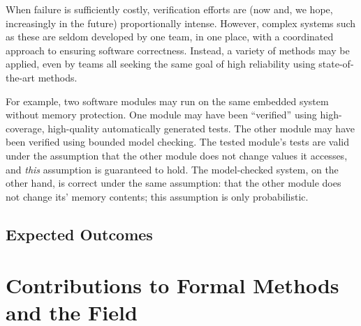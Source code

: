 When failure is sufficiently costly, verification efforts are (now
and, we hope, increasingly in the future) proportionally intense.
However, complex systems such as these are seldom developed by one
team, in one place, with a coordinated approach to ensuring software
correctness.  Instead, a variety of methods may be applied, even by
teams all seeking the same goal of high reliability using
state-of-the-art methods.  

For example, two software modules may run on the same embedded system
without memory protection.  One module may have been ``verified''
using high-coverage, high-quality automatically generated tests.  The
other module may have been verified using bounded model checking.  The
tested module's tests are valid under the assumption that the other
module does not change values it accesses, and
\emph{this} assumption is guaranteed to hold.  The model-checked
system, on the other hand, is correct under the same assumption: that
the other module does not change its' memory contents; this assumption
is only probabilistic.

\subsection{Expected Outcomes}

\section{Contributions to Formal Methods and the Field}